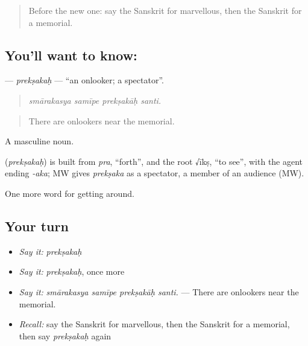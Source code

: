 \label{lesson:SA-C425-preksakah}



\begin{quote}
Before the new one: say the Sanskrit for marvellous, then the Sanskrit for a memorial.
\end{quote}

\subsection*{You'll want to know: }
\textbf{} — \emph{prekṣakaḥ} — \textquotedblleft{}an onlooker; a spectator\textquotedblright{}.

\begin{quote}
   
\end{quote}

\begin{quote}
\emph{smārakasya samīpe prekṣakāḥ santi.}
\end{quote}

\begin{quote}
There are onlookers near the memorial.
\end{quote}

A masculine noun.

\begin{cousinweb}
\textbf{} (\emph{prekṣakaḥ}) is built from \emph{pra}, \textquotedblleft{}forth\textquotedblright{}, and the root √īkṣ, \textquotedblleft{}to see\textquotedblright{}, with the agent ending \emph{-aka}; MW gives \emph{prekṣaka} as a spectator, a member of an audience (MW).
\end{cousinweb}

\begin{grammarlens}[title={What you've built}]
One more word for getting around.
\end{grammarlens}

\subsection*{Your turn}
\begin{itemize}
\raggedright
  \item \emph{Say it:} \emph{prekṣakaḥ}
  \item \emph{Say it:} \emph{prekṣakaḥ}, once more
  \item \emph{Say it:} \emph{smārakasya samīpe prekṣakāḥ santi.} — There are onlookers near the memorial.
  \item \emph{Recall:} say the Sanskrit for marvellous, then the Sanskrit for a memorial, then say \emph{prekṣakaḥ} again
\end{itemize}

